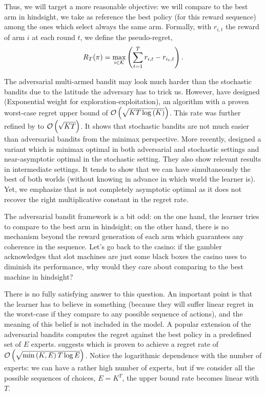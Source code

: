 {Thus,  we will target a more reasonable objective: we will compare to the best arm in hindsight, \ie we take as reference the best policy (for this reward sequence) among the ones which select always the same arm. Formally, with $r_{i,t}$ the reward of arm $i$ at each round $t$, we define the pseudo-regret,
\[
R_T(\pi) = \max_{i \in \mathcal{K}} \left( \sum_{t=1}^T  r_{i,t} - r_{i_t,t}\right).
\]

The adversarial multi-armed bandit may look much harder than the stochastic bandits due to the latitude the adversary has to trick us. However, \citet{auer2002nonstochastic} have designed \EXP (Exponential weight for exploration-exploitation), an algorithm with a proven worst-case regret upper bound of $\mathcal{O}\left(\sqrt{KT\log\left(K\right)}\right)$. This rate was further refined by \INF \citep{audibert2009minimax} to $\mathcal{O}\left(\sqrt{KT}\right)$. It shows that stochastic bandits are not much easier than adversarial bandits from the minimax perspective. More recently, \citet{zimmert2018tsallis} designed a variant \TsallisINF which is minimax optimal in both adversarial and stochastic settings and near-asymptotic optimal in the stochastic setting. They also show relevant results in intermediate settings. It tends to show that we can have simultaneously the best of both worlds (without knowing in advance in which world the learner is).  Yet, we emphasize that \TsallisINF is not completely asymptotic optimal as it does not recover the right multiplicative constant in the regret rate. 

The adversarial bandit framework is a bit odd: on the one hand, the learner tries to compare to the best arm in hindsight; on the other hand, there is no mechanism beyond the reward generation of each arm which guarantees any coherence in the sequence. Let's go back to the casino: if the gambler acknowledges that slot machines are just some black boxes the casino uses to diminish its performance, why would they care about comparing to the best machine in hindsight? 

There is no fully satisfying answer to this question. An important point is that the learner has to believe in something (because they will suffer linear regret in the worst-case if they compare to any possible sequence of actions), and the meaning of this belief is not included in the model. A popular extension of the adversarial bandits computes the regret against the best policy in a predefined set of $E$ experts.  \citet{auer2002nonstochastic} suggests \EXPfour which is proven to achieve a regret rate of $\mathcal{O}\left(\sqrt{\min\left(K, E\right) T\log E}\right)$. Notice the logarithmic dependence with the number of experts: we can have a rather high number of experts, but if we consider all the possible sequences of choices, \ie $ E = K^T$, the upper bound rate becomes linear with $T$. 

}
